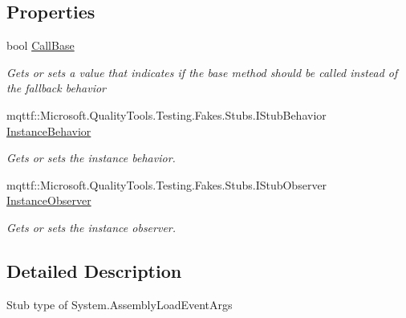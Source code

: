 \subsection*{Properties}
\begin{DoxyCompactItemize}
\item 
bool \hyperlink{class_system_1_1_fakes_1_1_stub_assembly_load_event_args_a2ba10e6304ee45333a1d7eb54fb41fca}{Call\-Base}
\begin{DoxyCompactList}\small\item\em Gets or sets a value that indicates if the base method should be called instead of the fallback behavior\end{DoxyCompactList}\item 
mqttf\-::\-Microsoft.\-Quality\-Tools.\-Testing.\-Fakes.\-Stubs.\-I\-Stub\-Behavior \hyperlink{class_system_1_1_fakes_1_1_stub_assembly_load_event_args_a31105229fe08c957c5303797e52c081c}{Instance\-Behavior}
\begin{DoxyCompactList}\small\item\em Gets or sets the instance behavior.\end{DoxyCompactList}\item 
mqttf\-::\-Microsoft.\-Quality\-Tools.\-Testing.\-Fakes.\-Stubs.\-I\-Stub\-Observer \hyperlink{class_system_1_1_fakes_1_1_stub_assembly_load_event_args_af7c5cb32615e755de51b272eaa3a7ad3}{Instance\-Observer}
\begin{DoxyCompactList}\small\item\em Gets or sets the instance observer.\end{DoxyCompactList}\end{DoxyCompactItemize}


\subsection{Detailed Description}
Stub type of System.\-Assembly\-Load\-Event\-Args



